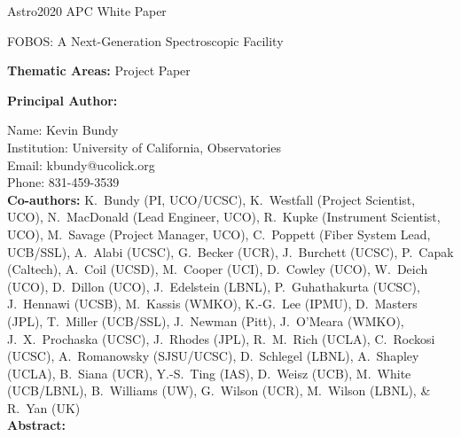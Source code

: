 \documentclass[oneside,12pt]{amsart}
\begin{document}
{\raggedright
\huge
Astro2020 APC White Paper \linebreak

FOBOS: A Next-Generation Spectroscopic Facility \linebreak
\normalsize
}

\noindent \textbf{Thematic Areas:} Project Paper
  
\noindent \textbf{Principal Author:}

\noindent Name:	Kevin Bundy \\
\noindent Institution:  University of California, Observatories \\
\noindent Email:  kbundy@ucolick.org \\
\noindent Phone:  831-459-3539 \\
 
\noindent \textbf{Co-authors:} {\footnotesize K.~Bundy (PI, UCO/UCSC), K.~Westfall (Project
Scientist, UCO), N.~MacDonald (Lead Engineer, UCO), R.~Kupke
(Instrument Scientist, UCO), M.~Savage (Project Manager, UCO),
C.~Poppett (Fiber System Lead, UCB/SSL), A.~Alabi (UCSC), G.~Becker
(UCR), J.~Burchett (UCSC), P.~Capak (Caltech), A.~Coil (UCSD),
M.~Cooper (UCI), D.~Cowley (UCO), W.~Deich (UCO), D.~Dillon (UCO),
J.~Edelstein (LBNL), P.~Guhathakurta (UCSC), J.~Hennawi (UCSB), M.~Kassis (WMKO),
K.-G.~Lee (IPMU), D.~Masters (JPL), T.~Miller (UCB/SSL), J.~Newman
(Pitt), J.~O'Meara (WMKO), J.~X.~Prochaska (UCSC), J.~Rhodes (JPL), R.~M.~Rich (UCLA),
C.~Rockosi (UCSC), A.~Romanowsky (SJSU/UCSC), D.~Schlegel (LBNL),
A.~Shapley (UCLA), B.~Siana (UCR), Y.-S.~Ting (IAS), D.~Weisz
(UCB), M.~White (UCB/LBNL), B.~Williams (UW), G.~Wilson (UCR),
M.~Wilson (LBNL), \& R.~Yan (UK)} \\

\noindent \textbf{Abstract:} 
\end{document}
